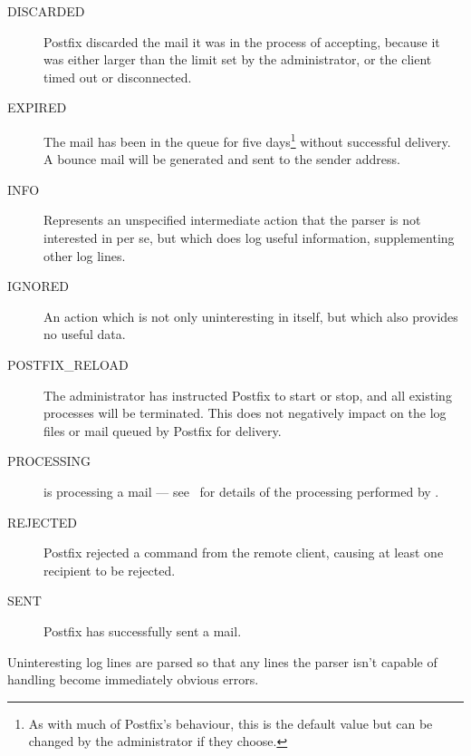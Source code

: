 \begin{description}
\begin{description}
            \item [DISCARDED] Postfix discarded the mail it was in the
                process of accepting, because it was either larger than the
                limit set by the administrator, or the client timed out or
                disconnected.

            \item [EXPIRED] The mail has been in the queue for five
                days\footnote{As with much of Postfix's behaviour, this is
                the default value but can be changed by the administrator
                if they choose.} without successful delivery.  A bounce
                mail will be generated and sent to the sender address.

            \item [INFO] Represents an unspecified intermediate action that
                the parser is not interested in per se, but which does log
                useful information, supplementing other log lines.

            \item [IGNORED] An action which is not only uninteresting in
                itself, but which also provides no useful data.

            \item [POSTFIX\_RELOAD] The administrator has instructed
                Postfix to start or stop, and all existing 
                processes will be terminated.  This does not negatively
                impact on the log files or mail queued by Postfix for
                delivery.

            \item [PROCESSING]  is processing a mail ---
                see~\cite{postfix-cleanup} for details of the processing
                performed by .

            \item [REJECTED] Postfix rejected a command from the remote
                client, causing at least one recipient to be rejected.

            \item [SENT] Postfix has successfully sent a mail.

        \end{description}

        Uninteresting log lines are parsed so that any lines the parser
        isn't capable of handling become immediately obvious errors.


\end{description}
